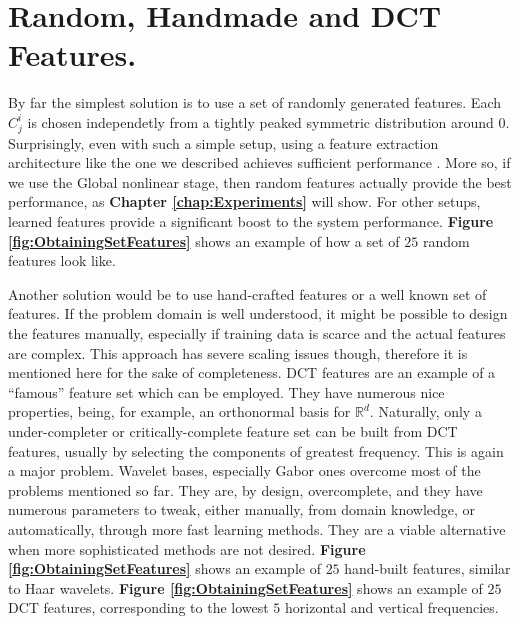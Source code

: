 \documentclass[12pt,a4paper,oneside,english]{UPBThesis}
\newcommand{\hcsignalspace}{\mathbb{R}^d}
\begin{document}
\section{Random, Handmade and DCT Features.}
\label{sec:RandomDCTPCAFeatures}

By far the simplest solution is to use a set of randomly generated features. Each $C_j^i$ is chosen independetly from a tightly peaked symmetric distribution around $0$. Surprisingly, even with such a simple setup, using a feature extraction architecture like the one we described achieves sufficient performance \cite{importance-encoding-sparse-coding-vq,beyond-simple-features}. More so, if we use the Global nonlinear stage, then random features actually provide the best performance, as \textbf{Chapter \ref{chap:Experiments}} will show. For other setups, learned features provide a significant boost to the system performance. \textbf{Figure \ref{fig:ObtainingSetFeatures}} shows an example of how a set of $25$ random features look like.

Another solution would be to use hand-crafted features or a well known set of features. If the problem domain is well understood, it might be possible to design the features manually, especially if training data is scarce and the actual features are complex. This approach has severe scaling issues though, therefore it is mentioned here for the sake of completeness. DCT features are an example of a ``famous'' feature set which can be employed. They have numerous nice properties, being, for example, an orthonormal basis for $\hcsignalspace$. Naturally, only a under-completer or critically-complete feature set can be built from DCT features, usually by selecting the components of greatest frequency. This is again a major problem. Wavelet bases, especially Gabor ones \cite{sparse-coding-strategy-V1,simple-method-sparse-coding} overcome most of the problems mentioned so far. They are, by design, overcomplete, and they have numerous parameters to tweak, either manually, from domain knowledge, or automatically, through more fast learning methods. They are a viable alternative when more sophisticated methods are not desired. \textbf{Figure \ref{fig:ObtainingSetFeatures}} shows an example of $25$ hand-built features, similar to Haar wavelets. \textbf{Figure \ref{fig:ObtainingSetFeatures}} shows an example of $25$ DCT features, corresponding to the lowest $5$ horizontal and vertical frequencies.
\end{document}

